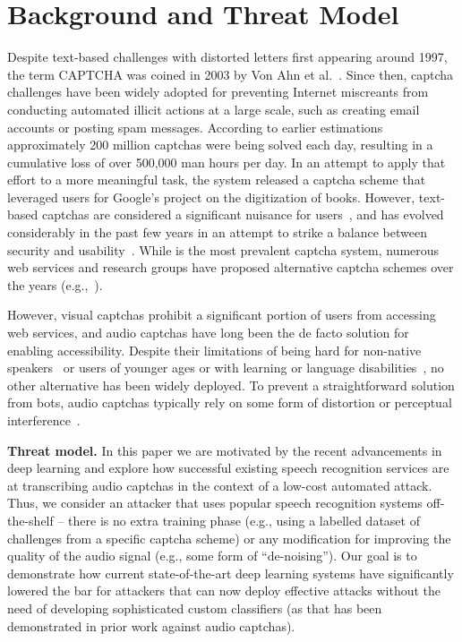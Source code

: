 \section{Background and Threat Model}
\label{sec:background}

Despite text-based challenges with distorted letters first appearing around 1997,
the term CAPTCHA was coined in 2003 by Von Ahn et al.~\cite{captcha}. Since 
then, captcha challenges have been widely adopted for preventing Internet 
miscreants from conducting automated illicit actions at a large scale, such as 
creating email accounts or posting spam messages. According to earlier estimations~\cite{captcha_stats}
approximately 200 million captchas were being solved each day, resulting in a
cumulative loss of over 500,000 man hours per day. In an attempt to apply that 
effort to a more meaningful task, the \re system released a captcha scheme that
leveraged users for Google's project on the digitization of books. However, 
text-based captchas are considered a significant nuisance for users~\cite{scientific_american},
and \re has evolved considerably in the past few years in an attempt to strike 
a balance between security and usability~\cite{recaptcha}. While \re is the
most prevalent captcha system, numerous web services and research groups have 
proposed alternative captcha schemes over the years (e.g.,~\cite{Chew04,asirra,dcaptcha}).

However, visual captchas prohibit a significant portion of users from accessing 
web services, and audio captchas have long been the de facto solution for
enabling accessibility. Despite their limitations of being hard for
non-native speakers~\cite{yan2008usability} or users of younger ages 
or with learning or language disabilities~\cite{schlaikjer2007dual},
no other alternative has been widely deployed.
To prevent a straightforward solution from bots, audio captchas 
typically rely on some form of distortion or perceptual interference~\cite{shinn2008object}.

\textbf{Threat model.} In this paper we are motivated by the recent advancements 
in deep learning and explore how successful existing speech recognition services
are at transcribing audio captchas in the context of a low-cost automated attack.
Thus, we consider an attacker that uses popular speech recognition systems off-the-shelf --
there is no extra training phase (e.g., using a labelled dataset of challenges from 
a specific captcha scheme) or any modification for improving the quality of the audio 
signal (e.g., some form of ``de-noising''). Our goal is to demonstrate how current 
state-of-the-art deep learning systems have significantly lowered the bar for attackers
that can now deploy effective attacks without the need of developing sophisticated 
custom classifiers (as that has been demonstrated in prior work against audio captchas).

